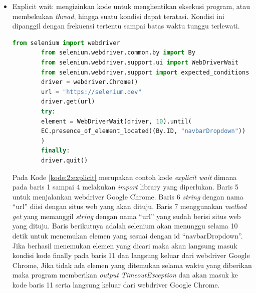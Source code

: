 \begin{itemize}
	\item Explicit wait: mengizinkan kode untuk menghentikan eksekusi program, atau membekukan \textit{thread}, hingga suatu kondisi dapat teratasi. Kondisi ini dipanggil dengan frekuensi tertentu sampai batas waktu tunggu terlewati.
	\begin{lstlisting}[language=python, caption=Contoh kode Explicit wait, label=kode:2:explicit]
		from selenium import webdriver
		from selenium.webdriver.common.by import By
		from selenium.webdriver.support.ui import WebDriverWait
		from selenium.webdriver.support import expected_conditions as EC
		driver = webdriver.Chrome()
		url = "https://selenium.dev"
		driver.get(url)	
		try:
		element = WebDriverWait(driver, 10).until(
		EC.presence_of_element_located((By.ID, "navbarDropdown"))
		)
		finally:
		driver.quit()
	\end{lstlisting}
	Pada Kode \ref{kode:2:explicit} merupakan contoh kode \textit{explicit wait} dimana pada baris 1 sampai 4 melakukan \textit{import} library yang diperlukan. Baris 5 untuk menjalankan webdriver Google Chrome. Baris 6 \textit{string} dengan nama ``url'' diisi dengan situs web yang akan dituju. Baris 7 menggunakan \textit{method get} yang memanggil \textit{string} dengan nama ``url'' yang sudah berisi situs web yang dituju. Baris berikutnya adalah selenium akan menunggu selama 10 detik untuk menemukan elemen yang sesuai dengan id ``navbarDropdown''. Jika berhasil menemukan elemen yang dicari maka akan langsung masuk kondisi kode finally pada baris 11 dan langsung keluar dari webdriver Google Chrome, Jika tidak ada elemen yang ditemukan selama waktu yang diberikan maka program memberikan \textit{output} \textit{TimeoutException} dan akan masuk ke kode baris 11 serta langsung keluar dari webdriver Google Chrome.	
\end{itemize}

